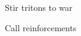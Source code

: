 \startitemize[1,packed]

\item Stir tritons to war

 
\item Call reinforcements


\stopitemize
 







